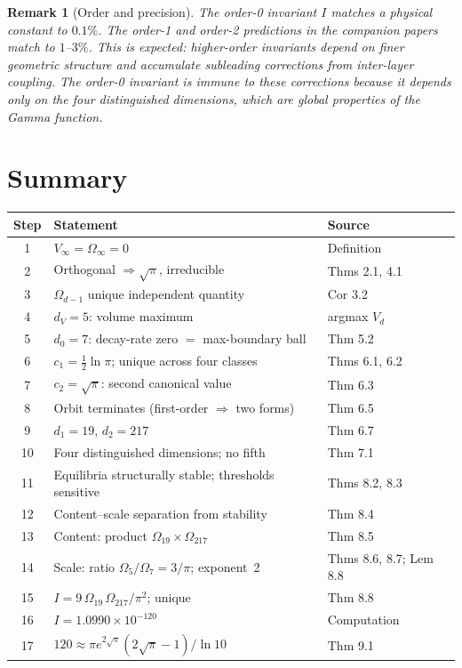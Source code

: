 \documentclass[11pt,a4paper]{article}
\newtheorem{remark}[theorem]{Remark}
\begin{document}
\begin{remark}[Order and precision]
The order-0 invariant $I$ matches a physical constant to $0.1\%$. The
order-1 and order-2 predictions in the companion papers match to
$1$--$3\%$. This is expected: higher-order invariants depend on finer
geometric structure and accumulate subleading corrections from inter-layer
coupling. The order-0 invariant is immune to these corrections because it
depends only on the four distinguished dimensions, which are global
properties of the Gamma function.
\end{remark}

\section{Summary}

\begin{center}
\begin{tabular}{cll}
\toprule
Step & Statement & Source \\
\midrule
1 & $V_\infty = \Omega_\infty = 0$ & Definition \\
2 & Orthogonal $\Rightarrow\sqrt{\pi}$, irreducible & Thms 2.1, 4.1 \\
3 & $\Omega_{d-1}$ unique independent quantity & Cor 3.2 \\
4 & $d_V = 5$: volume maximum & argmax $V_d$ \\
5 & $d_0 = 7$: decay-rate zero $=$ max-boundary ball & Thm 5.2 \\
6 & $c_1 = \tfrac{1}{2}\ln\pi$; unique across four classes & Thms 6.1, 6.2 \\
7 & $c_2 = \sqrt{\pi}$: second canonical value & Thm 6.3 \\
8 & Orbit terminates (first-order $\Rightarrow$ two forms) & Thm 6.5 \\
9 & $d_1 = 19$,\; $d_2 = 217$ & Thm 6.7 \\
10 & Four distinguished dimensions; no fifth & Thm 7.1 \\
11 & Equilibria structurally stable; thresholds sensitive & Thms 8.2, 8.3 \\
12 & Content--scale separation from stability & Thm 8.4 \\
13 & Content: product $\Omega_{19}\times\Omega_{217}$ & Thm 8.5 \\
14 & Scale: ratio $\Omega_5/\Omega_7 = 3/\pi$; exponent~2 & Thms 8.6, 8.7; Lem 8.8 \\
15 & $I = 9\,\Omega_{19}\,\Omega_{217}/\pi^2$; unique & Thm 8.8 \\
16 & $I = 1.0990\times 10^{-120}$ & Computation \\
17 & $120\approx\pi e^{2\sqrt{\pi}}(2\sqrt{\pi}-1)/\ln 10$ & Thm 9.1 \\
\bottomrule
\end{tabular}
\end{center}
\end{document}
